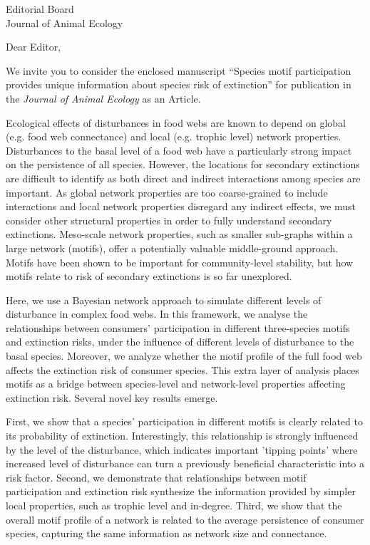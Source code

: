 \documentclass[10.5pt]{letter}
\date{October XX, 2022}
\begin{document}
\begin{letter}{
\vspace{-2.5cm}

Editorial Board\\
Journal of Animal Ecology} %


\opening{Dear Editor,}

We invite you to consider the enclosed manuscript ``Species motif participation provides unique information about species risk of extinction'' for publication in the \emph{Journal of Animal Ecology} as an Article. 

Ecological effects of disturbances in food webs are known to depend on global (e.g. food web connectance) and local (e.g. trophic level) network properties. Disturbances to the basal level of a food web have a particularly strong impact on the persistence of all species. 
However, the locations for secondary extinctions are difficult to identify as both direct and indirect interactions among species are important. As global network properties are too coarse-grained to include interactions and local network properties disregard any indirect effects, we must consider other structural properties in order to fully understand secondary extinctions. Meso-scale network properties, such as smaller sub-graphs within a large network (motifs), offer a potentially valuable middle-ground approach. Motifs have been shown to be important for community-level stability, but how motifs relate to risk of secondary extinctions is so far unexplored.   

Here, we use a Bayesian network approach to simulate different levels of disturbance in complex food webs.
In this framework, we analyse the relationships between consumers' participation in different three-species motifs and extinction risks, under the influence of different levels of disturbance to the basal species. 
Moreover, we analyze whether the motif profile of the full food web affects the extinction risk of consumer species.
This extra layer of analysis places motifs as a bridge between species-level and network-level properties affecting extinction risk.
Several novel key results emerge.

First, we show that a species' participation in different motifs is clearly related to its probability of extinction. Interestingly, this relationship is strongly influenced by the level of the disturbance, which indicates important 'tipping points' where increased level of disturbance can turn a previously beneficial characteristic into a risk factor. 
Second, we demonstrate that relationships between motif participation and extinction risk synthesize the information provided by simpler local properties, such as trophic level and in-degree. 
Third, we show that the overall motif profile of a network is related to the average persistence of consumer species, capturing the same information as network size and connectance. 


\end{letter}
\end{document}
